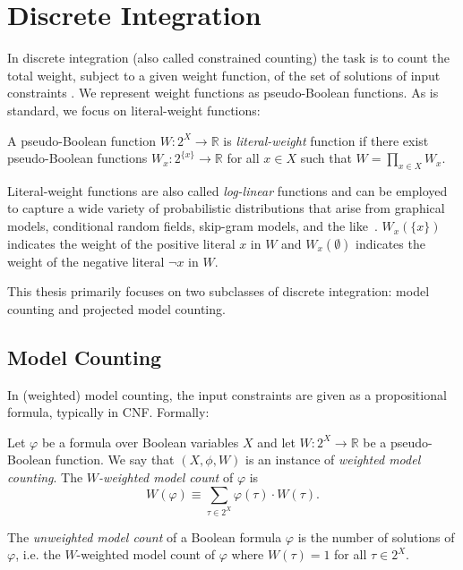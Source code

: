 \section{Discrete Integration}
\label{sec:wmc}

In discrete integration (also called constrained counting) the task is to count the total weight, subject to a given weight function, of the set of solutions of input constraints \cite{GSS08}. We represent weight functions as pseudo-Boolean functions. As is standard, we focus on literal-weight functions: 
\begin{definition}
\label{def:literal-weight}
A pseudo-Boolean function $W: 2^X \rightarrow \mathbb{R}$ is \emph{literal-weight} function if there exist pseudo-Boolean functions $W_x: 2^{\{x\}} \rightarrow \mathbb{R}$ for all $x \in X$ such that $W = \prod_{x \in X} W_x$. 
\end{definition}
Literal-weight functions are also called \emph{log-linear} functions and can be employed to capture a wide variety of probabilistic distributions that arise from graphical models, conditional random fields, skip-gram models, and the like~\cite{KF09}.
$W_x(\{x\})$ indicates the weight of the positive literal $x$ in $W$ and $W_x(\emptyset)$ indicates the weight of the negative literal $\neg x$ in $W$.

This thesis primarily focuses on two subclasses of discrete integration: model counting and projected model counting.

\subsection{Model Counting}
In (weighted) model counting, the input constraints are given as a propositional formula, typically in CNF. Formally:
\begin{definition}
  Let $\varphi$ be a formula over Boolean variables $X$ and let $W: 2^X \rightarrow \mathbb{R}$ be a pseudo-Boolean function. We say that $(X, \phi, W)$ is an instance of \emph{weighted model counting}. The \emph{$W$-weighted model count} of $\varphi$ is
  $$W(\varphi) \equiv \sum_{\tau \in 2^X} \varphi(\tau) \cdot W(\tau).$$
\end{definition}

The \emph{unweighted model count} of a Boolean formula $\varphi$ is the number of solutions of $\varphi$, i.e. the $W$-weighted model count of $\varphi$ where $W(\tau) = 1$ for all $\tau \in 2^X$.


